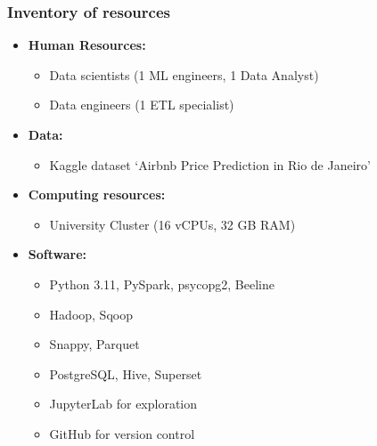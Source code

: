\subsubsection{Inventory of resources}\label{sec:inventoryOfResources}
\begin{itemize}
  \item \textbf{Human Resources:}
        \begin{itemize}
          \item Data scientists (1 ML engineers, 1 Data Analyst)
          \item Data engineers (1 ETL specialist)
        \end{itemize}
  \item \textbf{Data:}
        \begin{itemize}
          \item Kaggle dataset `Airbnb Price Prediction in Rio de Janeiro'~\cite{airbnb_rio_kaggle}
        \end{itemize}
  \item \textbf{Computing resources:}
        \begin{itemize}
          \item University Cluster (16 vCPUs, 32 GB RAM)
        \end{itemize}
  \item \textbf{Software:}
        \begin{itemize}
          \item Python 3.11, PySpark, psycopg2, Beeline
          \item Hadoop, Sqoop
          \item Snappy, Parquet
          \item PostgreSQL, Hive, Superset
          \item JupyterLab for exploration
          \item GitHub for version control
        \end{itemize}
\end{itemize}

